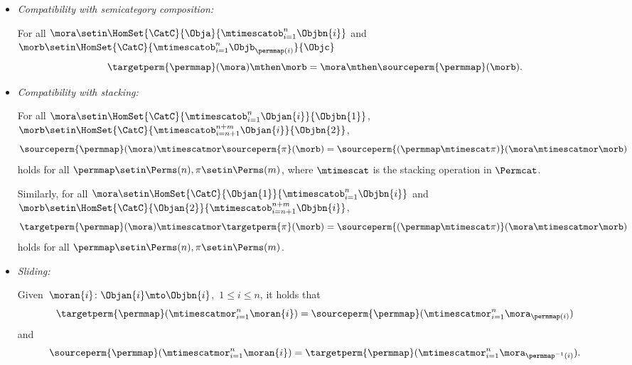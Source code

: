 \begin{ctdefinition}
\begin{itemize}
        \item \emph{Compatibility with semicategory composition:}

              For all $\mora \setin \HomSet{\CatC}{\Obja}{\mtimescatob_{i=1}^n \Objbn{i}}$ and $\morb \setin \HomSet{\CatC}{\mtimescatob_{i=1}^n \Objb_{\permmap(i)}}{\Objc}$
              \begin{equation}
                  \label{eq:perm-compatibility-with-composition}
                  \targetperm{\permmap} (\mora) \mthen \morb = \mora \mthen \sourceperm{\permmap}(\morb).
              \end{equation}

        \item \emph{Compatibility with stacking:}

              For all $\mora \setin\HomSet{\CatC}{\mtimescatob_{i=1}^n \Objan{i}}{\Objbn{1}}$, $\morb \setin\HomSet{\CatC}{\mtimescatob_{i=n+1}^{n+m} \Objan{i}}{\Objbn{2}}$,
              \begin{equation}
                  \sourceperm{\permmap}(\mora) \mtimescatmor \sourceperm{\pi}(\morb) = \sourceperm{(\permmap \mtimescat \pi)}(\mora \mtimescatmor \morb)
              \end{equation}
              holds for all $\permmap \setin\Perms(n), \pi \setin\Perms(m)$, where $\mtimescat$ is the stacking operation in $\Permcat$.

              Similarly, for all $\mora \setin\HomSet{\CatC}{\Objan{1}}{\mtimescatob_{i=1}^n \Objbn{i}} $ and $\morb \setin\HomSet{\CatC}{\Objan{2}}{\mtimescatob_{i=n+1}^{n+m} \Objbn{i}}$,
              \begin{equation}
                  \targetperm{\permmap}(\mora) \mtimescatmor \targetperm{\pi}(\morb) = \sourceperm{(\permmap \mtimescat \pi)}(\mora \mtimescatmor \morb)
              \end{equation}
              holds for all $\permmap \setin\Perms(n), \pi \setin\Perms(m)$.

        \item \emph{Sliding:}

              Given~$\moran{i} \colon \Objan{i} \mto \Objbn{i}$,~$1 \leq i \leq n$, it holds that
              \begin{equation}
                  \label{eq:perm-compatibility-with-stacking-1}
                  \targetperm{\permmap} ( \mtimescatmor_{i=1}^n \moran{i} ) = \sourceperm{\permmap}( \mtimescatmor_{i=1}^n \mora_{\permmap(i)} )
              \end{equation}
              and
              \begin{equation}
                  \label{eq:perm-compatibility-with-stacking-2}
                  \sourceperm{\permmap} ( \mtimescatmor_{i=1}^n \moran{i} ) = \targetperm{\permmap} ( \mtimescatmor_{i=1}^n \mora_{\permmap^{-1}(i)} ).
              \end{equation}

    \end{itemize}
\end{ctdefinition}

